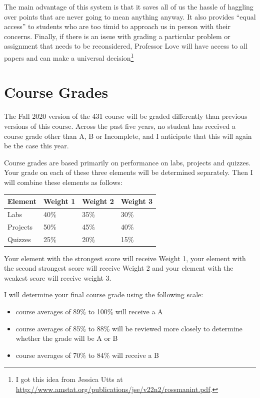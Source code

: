 \documentclass[
]{book}
\providecommand{\tightlist}{%
  \setlength{\itemsep}{0pt}\setlength{\parskip}{0pt}}
\begin{document}
The main advantage of this system is that it saves all of us the hassle of haggling over points that are never going to mean anything anyway. It also provides ``equal access'' to students who are too timid to approach us in person with their concerns. Finally, if there is an issue with grading a particular problem or assignment that needs to be reconsidered, Professor Love will have access to all papers and can make a universal decision\footnote{I got this idea from Jessica Utts at \url{http://www.amstat.org/publications/jse/v22n2/rossmanint.pdf}.}

\hypertarget{course-grades}{%
\chapter{Course Grades}\label{course-grades}}

The Fall 2020 version of the 431 course will be graded differently than previous versions of this course. Across the past five years, no student has received a course grade other than A, B or Incomplete, and I anticipate that this will again be the case this year.

Course grades are based primarily on performance on labs, projects and quizzes. Your grade on each of these three elements will be determined separately. Then I will combine these elements as follows:

\begin{longtable}[]{@{}llll@{}}
\toprule
Element & Weight 1 & Weight 2 & Weight 3\tabularnewline
\midrule
\endhead
Labs & 40\% & 35\% & 30\%\tabularnewline
Projects & 50\% & 45\% & 40\%\tabularnewline
Quizzes & 25\% & 20\% & 15\%\tabularnewline
\bottomrule
\end{longtable}

Your element with the strongest score will receive Weight 1, your element with the second strongest score will receive Weight 2 and your element with the weakest score will receive weight 3.

I will determine your final course grade using the following scale:

\begin{itemize}
\tightlist
\item
  course averages of 89\% to 100\% will receive a A
\item
  course averages of 85\% to 88\% will be reviewed more closely to determine whether the grade will be A or B
\item
  course averages of 70\% to 84\% will receive a B
\end{itemize}
\end{document}
